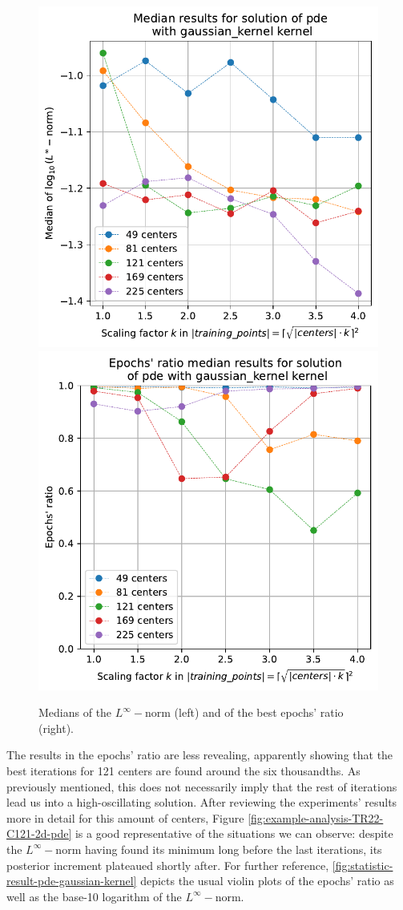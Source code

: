 \documentclass[12pt]{report} %
\begin{document}
\begin{figure}[h]
  {\includegraphics[height=.45\textwidth]
  {imagenes/experiments/2d/pde_fornberg_wright/medians_linf_pde_gaussian_kernel.pdf}}
  {\includegraphics[height=.45\textwidth]
  {imagenes/experiments/2d/pde_fornberg_wright/medians_epochs_pde_gaussian_kernel.pdf}}
  \caption{Medians of the $L^\infty-$norm (left) and of the best epochs' ratio (right).}
  \label{fig:medians-epochs-statistic-2d-pde}
\end{figure}

The results in the epochs' ratio are less revealing, apparently showing that the best iterations for 121 centers are found around the six thousandths. 
As previously mentioned, this does not necessarily imply that the rest of iterations lead us into a high-oscillating solution. 
After reviewing the experiments' results more in detail for this amount of centers, Figure \ref{fig:example-analysis-TR22-C121-2d-pde} is a good representative of the situations we can observe: despite the $L^\infty-$norm having found its minimum long before the last iterations, its posterior increment plateaued shortly after.
For further reference, \ref{fig:statistic-result-pde-gaussian-kernel} depicts the usual violin plots of the epochs' ratio as well as the base-10 logarithm of the $L^\infty-$norm.
\end{document}
